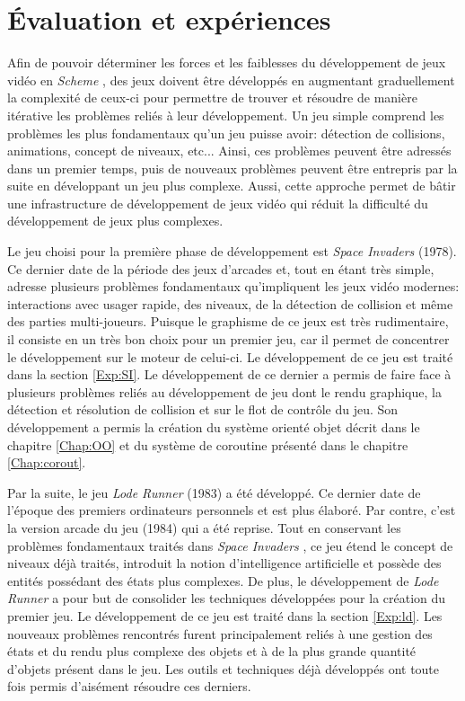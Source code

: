 \documentclass[12pt,twoside,letterpaper,francais]{book}
\newcommand{\lr}{{\textit{Lode Runner }}}
\newcommand{\si}{{\textit{Space Invaders }}}
\newcommand{\Schemelang}{{\textit{Scheme }}}
\begin{document}
\clearpage

\chapter{Évaluation et expériences}\label{Chap:exp}
Afin de pouvoir déterminer les forces et les faiblesses du
développement de jeux vidéo en \Schemelang, des jeux doivent être
développés en augmentant graduellement la complexité de ceux-ci pour
permettre de trouver et résoudre de manière itérative les problèmes
reliés à leur développement. Un jeu simple comprend les problèmes les
plus fondamentaux qu'un jeu puisse avoir: détection de collisions,
animations, concept de niveaux, etc... Ainsi, ces problèmes peuvent
être adressés dans un premier temps, puis de nouveaux problèmes
peuvent être entrepris par la suite en développant un jeu plus
complexe. Aussi, cette approche permet de bâtir une infrastructure de
développement de jeux vidéo qui réduit la difficulté du développement
de jeux plus complexes.

Le jeu choisi pour la première phase de développement est \si
(1978). Ce dernier date de la période des jeux d'arcades et, tout en
étant très simple, adresse plusieurs problèmes fondamentaux
qu'impliquent les jeux vidéo modernes: interactions avec usager
rapide, des niveaux, de la détection de collision et même des parties
multi-joueurs. Puisque le graphisme de ce jeux est très rudimentaire,
il consiste en un très bon choix pour un premier jeu, car il permet de
concentrer le développement sur le moteur de celui-ci. Le
développement de ce jeu est traité dans la section \ref{Exp:SI}. Le
développement de ce dernier a permis de faire face à plusieurs
problèmes reliés au développement de jeu dont le rendu graphique, la
détection et résolution de collision et sur le flot de contrôle du
jeu. Son développement a permis la création du système orienté objet
décrit dans le chapitre \ref{Chap:OO} et du système de coroutine
présenté dans le chapitre \ref{Chap:corout}.

Par la suite, le jeu \lr (1983) a été développé. Ce dernier date de
l'époque des premiers ordinateurs personnels et est plus élaboré. Par
contre, c'est la version arcade du jeu (1984) qui a été reprise. Tout
en conservant les problèmes fondamentaux traités dans \si, ce jeu
étend le concept de niveaux déjà traités, introduit la notion
d'intelligence artificielle et possède des entités possédant des états
plus complexes. De plus, le développement de \lr a pour but de
consolider les techniques développées pour la création du premier
jeu. Le développement de ce jeu est traité dans la section
\ref{Exp:ld}. Les nouveaux problèmes rencontrés furent principalement
reliés à une gestion des états et du rendu plus complexe des objets et
à de la plus grande quantité d'objets présent dans le jeu. Les outils
et techniques déjà développés ont toute fois permis d'aisément
résoudre ces derniers.
\end{document}
